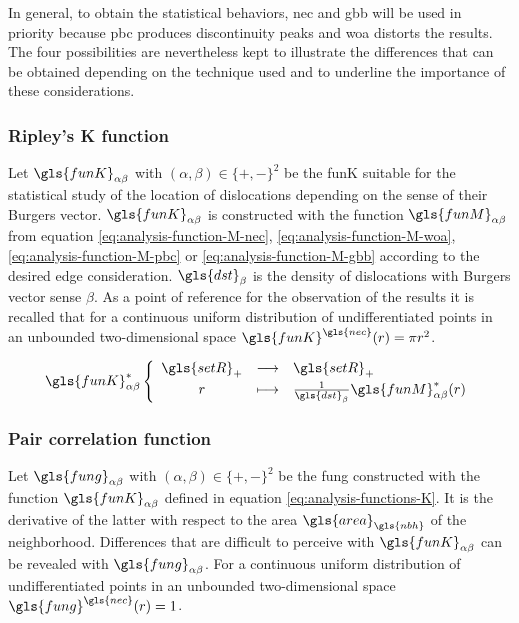 \bigskip \bigskip

In general, to obtain the statistical behaviors, \gls{nec} and \gls{gbb} will be used in priority because \gls{pbc} produces discontinuity peaks and \gls{woa} distorts the results.
The four possibilities are nevertheless kept to illustrate the differences that can be obtained depending on the technique used and to underline the importance of these considerations.

\subsubsection{Ripley's K function}\label{sec:analysis-functions-K}

Let \( \gls{funK}_{\alpha \beta} \) with \( (\alpha, \beta) \in \{ +, - \}^2 \) be the \glsdesc{funK} \cite{IPSS2008} suitable for the statistical study of the location of dislocations depending on the sense of their Burgers vector.
\( \gls{funK}_{\alpha \beta} \) is constructed with the function \( \gls{funM}_{\alpha \beta} \) from equation \eqref{eq:analysis-function-M-nec}, \eqref{eq:analysis-function-M-woa}, \eqref{eq:analysis-function-M-pbc} or \eqref{eq:analysis-function-M-gbb} according to the desired edge consideration.
\( \gls{dst}_\beta \) is the density of dislocations with Burgers vector sense \( \beta \).
As a point of reference for the observation of the results it is recalled that for a continuous uniform distribution of undifferentiated points in an unbounded two-dimensional space \( \gls{funK}^{\gls{nec}}(r) = \pi r^2 \).

\begin{equation}\label{eq:analysis-functions-K}
  \define{
    \gls{funK}^*_{\alpha \beta}
  }{
    \gls{setR}_+
  }{
    \gls{setR}_+
  }{
    r
  }{
    \frac{1}{\gls{dst}_\beta} \gls{funM}^*_{\alpha \beta}(r)
  }
\end{equation}

%

\newpage

\subsubsection{Pair correlation function}\label{sec:analysis-functions-g}

Let \( \gls{fung}_{\alpha \beta} \) with \( (\alpha, \beta) \in \{ +, - \}^2 \) be the \glsdesc{fung} \cite{IPSS2008} constructed with the function \( \gls{funK}_{\alpha \beta} \) defined in equation \eqref{eq:analysis-functions-K}.
It is the derivative of the latter with respect to the area \( \gls{area}_{\gls{nbh}} \) of the neighborhood.
Differences that are difficult to perceive with \( \gls{funK}_{\alpha \beta} \) can be revealed with \( \gls{fung}_{\alpha \beta} \).
For a continuous uniform distribution of undifferentiated points in an unbounded two-dimensional space \( \gls{fung}^{\gls{nec}}(r) = 1 \).

